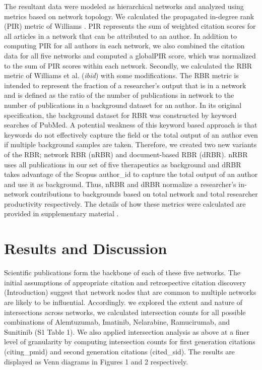 \documentclass[10pt,letterpaper]{article}
\begin{document}
The resultant data were modeled as hierarchical networks and analyzed using metrics based on network topology. We calculated the propagated in-degree rank (PIR) metric of Williams \cite {bibWilliams}. PIR represents the sum of weighted citation scores for all articles in a network that can be attributed to an author. In addition to computing PIR for all authors in each network, we also combined the citation data for all five networks and computed a globalPIR score, which was normalized to the sum of PIR scores within each network. Secondly, we calculated the RBR metric of Williams et al. (\textit{ibid}) with some modifications. The RBR metric is intended to represent the fraction of a researcher's output that is in a network and is defined as the ratio of the number of publications in network to the number of publications in a background dataset for an author. In its original specification, the background dataset for RBR was constructed by keyword searches of PubMed. A potential weakness of this keyword based approach is that keywords do not effectively capture the field or the total output of an author even if multiple background samples are taken. Therefore, we created two new variants of the RBR; network RBR (nRBR) and document-based RBR (dRBR). nRBR uses all publications in our set of five therapeutics as background and dRBR takes advantage of the Scopus author\_id to capture the total output of an author and use it as background. Thus, nRBR and dRBR normalize a researcher's in-network contributions to backgrounds based on total network and total researcher productivity respectively. The details of how these metrics were calculated are provided in supplementary material .\\
\vspace{2.5 mm}

\section*{Results and Discussion} Scientific publications form the backbone of each of these five networks. The initial assumptions of appropriate citation and retrospective citation discovery (Introduction) suggest that network nodes that are common to multiple networks are likely to be influential. Accordingly. we explored the extent and nature of intersections across networks, we calculated intersection counts for all possible combinations of Alemtuzumab, Imatinib, Nelarabine, Ramucirumab, and Sunitinib (S1 Table 1). We also applied intersection analysis as above at a finer level of granularity by computing intersection counts for first generation citations (citing\_pmid) and second generation citations (cited\_sid). The results are displayed as Venn diagrams in Figures 1 and 2 respectively. 
\end{document}
